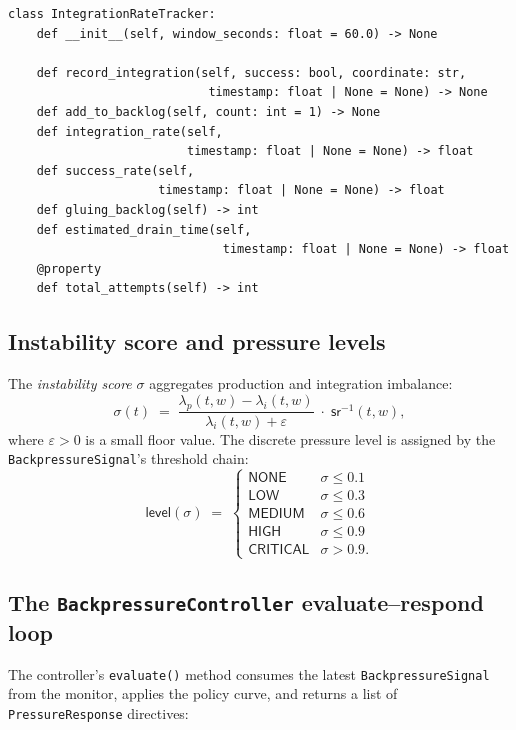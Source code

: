 \documentclass[11pt]{article}
\providecommand{\prodrate}{\lambda_p}              %
\providecommand{\intrate}{\lambda_i}               %
\providecommand{\instab}{\sigma}                   %
\providecommand{\BPCtrlPY}{\texttt{BackpressureController}}
\providecommand{\IntPY}{\texttt{IntegrationRateTracker}}
\providecommand{\BPSignalPY}{\texttt{BackpressureSignal}}
\begin{document}
\begin{lstlisting}[style=jugeo-python, caption={\IntPY{} interface.}]
class IntegrationRateTracker:
    def __init__(self, window_seconds: float = 60.0) -> None

    def record_integration(self, success: bool, coordinate: str,
                            timestamp: float | None = None) -> None
    def add_to_backlog(self, count: int = 1) -> None
    def integration_rate(self,
                         timestamp: float | None = None) -> float
    def success_rate(self,
                     timestamp: float | None = None) -> float
    def gluing_backlog(self) -> int
    def estimated_drain_time(self,
                              timestamp: float | None = None) -> float
    @property
    def total_attempts(self) -> int
\end{lstlisting}

\subsection{Instability score and pressure levels}

The \emph{instability score} $\instab$ aggregates production and
integration imbalance:
\[
  \instab(t)
  \;=\;
  \frac{\prodrate(t,w) - \intrate(t,w)}{\intrate(t,w) + \varepsilon}
  \;\cdot\; \mathsf{sr}^{-1}(t,w),
\]
where $\varepsilon > 0$ is a small floor value.  The discrete pressure
level is assigned by the \BPSignalPY{}'s threshold chain:
\[
  \mathsf{level}(\instab)
  \;=\;
  \begin{cases}
    \mathsf{NONE}     & \instab \leq 0.1 \\
    \mathsf{LOW}      & \instab \leq 0.3 \\
    \mathsf{MEDIUM}   & \instab \leq 0.6 \\
    \mathsf{HIGH}     & \instab \leq 0.9 \\
    \mathsf{CRITICAL} & \instab > 0.9.
  \end{cases}
\]

\subsection{The \BPCtrlPY{} evaluate--respond loop}

The controller's \texttt{evaluate()} method consumes the latest
\BPSignalPY{} from the monitor, applies the policy curve, and
returns a list of \texttt{PressureResponse} directives:
\end{document}
